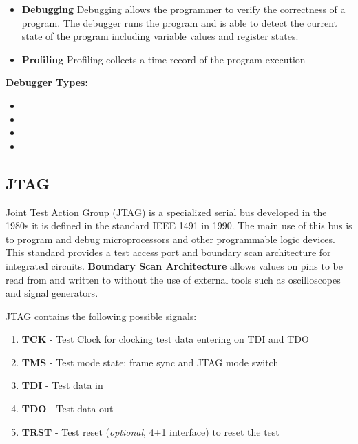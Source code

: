 \begin{itemize}
    \item \textbf{Debugging} Debugging allows the programmer to verify the correctness of a program. The debugger runs the program
    and is able to detect the current state of the program including variable values and register states.

    \item \textbf{Profiling} Profiling collects a time record of the program execution 
\end{itemize}

\textbf{Debugger Types:}
\begin{itemize}
    \item {}
    \item {}
    \item {}
    \item {}
\end{itemize}

\subsection{JTAG}
\label{section:JTAG}
Joint Test Action Group (JTAG) is a specialized serial bus developed in the 1980s it is defined in the standard IEEE 1491 in 1990.
The main use of this bus is to program and debug microprocessors and other programmable logic devices. This standard provides a test access
port and boundary scan architecture for integrated circuits. \textbf{Boundary Scan Architecture} allows values on pins to be read from and written
to without the use of external tools such as oscilloscopes and signal generators.



JTAG contains the following possible signals:
\begin{enumerate}
    \item \textbf{TCK} - Test Clock for clocking test data entering on TDI and TDO
    \item \textbf{TMS} - Test mode state: frame sync and JTAG mode switch
    \item \textbf{TDI} - Test data in
    \item \textbf{TDO} - Test data out
    \item \textbf{TRST} - Test reset (\textit{optional}, 4+1 interface) to reset the test
\end{enumerate}

